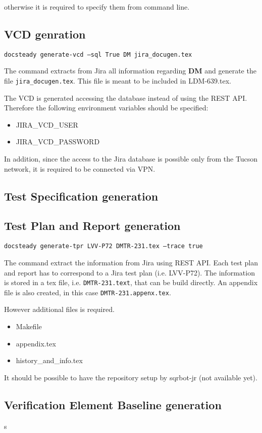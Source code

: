 \documentclass[DM]{lsstdoc}
\begin{document}
otherwise it is required to specify them from command line.


\subsection{VCD genration}

\texttt{docsteady generate-vcd --sql True DM jira\_docugen.tex}

The command extracts from Jira all information regarding \textbf{DM} and generate the file \texttt{jira\_docugen.tex}.
This file is meant to be included in LDM-639.tex.

The VCD is generated accessing the database instead of using the REST API. Therefore the following environment variables should be specified:

\begin{itemize}
\item JIRA\_VCD\_USER
\item JIRA\_VCD\_PASSWORD
\end{itemize}

In addition, since the access to the Jira database is possible only from the Tucson network, it is required to be connected via VPN.


\subsection{Test Specification generation}


\subsection{Test Plan and Report generation}

\texttt{docsteady generate-tpr LVV-P72 DMTR-231.tex --trace true}

The command extract the information from Jira using REST API.
Each test plan and report has to correspond to a Jira test plan (i.e. LVV-P72).
The information is stored in a tex file, i.e. \texttt{DMTR-231.text}, that can be build directly.
An appendix file is also created, in this case \texttt{DMTR-231.appenx.tex}.

However additional files is required.

\begin{itemize}
\item Makefile
\item appendix.tex
\item history\_and\_info.tex
\end{itemize}

It should be possible to have the repository setup by sqrbot-jr (not available yet).


\subsection{Verification Element Baseline generation}
s
\end{document}
